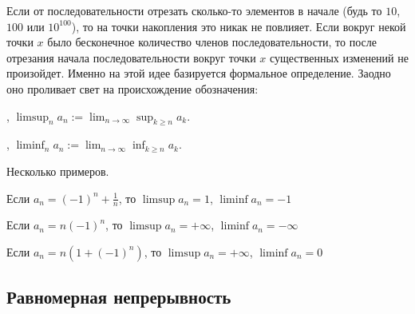 {Если от последовательности отрезать сколько-то элементов в начале (будь то $10$, $100$ или $10^{100}$), то на точки накопления это никак не повлияет. Если вокруг некой точки $x$ было бесконечное количество членов последовательности, то после отрезания начала последовательности вокруг точки $x$ существенных изменений не произойдет. Именно на этой идее базируется формальное определение. Заодно оно проливает свет на происхождение обозначения:

\begin{mydef}
 , $\limsup_{n}a_{n}:=\lim_{n\to\infty}\sup_{k\geq n}a_{k}$.

 , $\liminf_{n}a_{n}:=\lim_{n\to\infty}\inf_{k\geq n}a_{k}$.
\end{mydef}

Несколько примеров.
\begin{myex}
Если $a_{n}=(-1)^{n}+\frac{1}{n}$, то $\limsup a_{n}=1$, $\liminf a_{n}=-1$
\end{myex}

\begin{myex}
Если $a_{n}=n(-1)^{n}$, то $\limsup a_{n}=+\infty$, $\liminf a_{n}=-\infty$
\end{myex}

\begin{myex}
Если $a_{n}=n(1+(-1)^{n})$, то $\limsup a_{n}=+\infty$, $\liminf a_{n}=0$
\end{myex}


}\subsection{Равномерная непрерывность}
